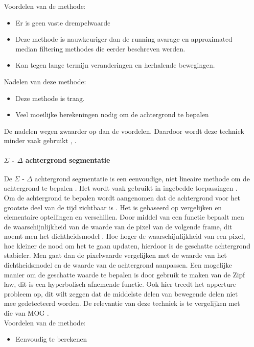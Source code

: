 Voordelen van de methode:
\begin{itemize}
	\item Er is geen vaste drempelwaarde
	\item Deze methode is nauwkeuriger dan de running avarage en approximated median filtering methodes die eerder beschreven werden.
	\item Kan tegen lange termijn veranderingen en herhalende bewegingen.
\end{itemize}
Nadelen van deze methode:
\begin{itemize}
	\item Deze methode is traag.
	\item Veel moeilijke berekeningen nodig om de achtergrond te bepalen
\end{itemize}
De nadelen wegen zwaarder op dan de voordelen. Daardoor wordt deze techniek minder vaak gebruikt \cite{bibSDB}, \cite{bibMOG}.

\paragraph{ $\Sigma$ - $\Delta$ achtergrond segmentatie}
De $\Sigma$ - $\Delta$ achtergrond segmentatie is een eenvoudige, niet lineaire methode om de achtergrond te bepalen \cite{bibSDB}. Het wordt vaak gebruikt in ingebedde toepassingen \cite{bibBET8}. Om de achtergrond te bepalen wordt aangenomen dat de achtergrond voor het grootste deel van de tijd zichtbaar is \cite{bibSDB2}. Het is gebaseerd op vergelijken en elementaire optellingen en verschillen. 
Door middel van een functie bepaalt men de waarschijnlijkheid van de waarde van de pixel van de volgende frame, dit noemt men het dichtheidsmodel .  Hoe hoger de waarschijnlijkheid van een pixel, hoe kleiner de nood om het te gaan updaten, hierdoor is de geschatte achtergrond stabieler. \cite{bibSDB2} Men gaat dan de pixelwaarde vergelijken met de waarde van het dichtheidsmodel en de waarde van de achtergrond aanpassen. Een mogelijke manier om de geschatte waarde te bepalen is door gebruik te maken van de Zipf law, dit is een hyperbolisch afnemende functie. Ook hier treedt het apperture probleem op, dit wilt zeggen dat de middelste delen van bewegende delen niet mee gedetecteerd worden. De relevantie van deze techniek is te vergelijken met die van MOG \cite{bibSDB}.\\
Voordelen van de methode:
\begin{itemize}
	\item Eenvoudig te berekenen
\end{itemize}


